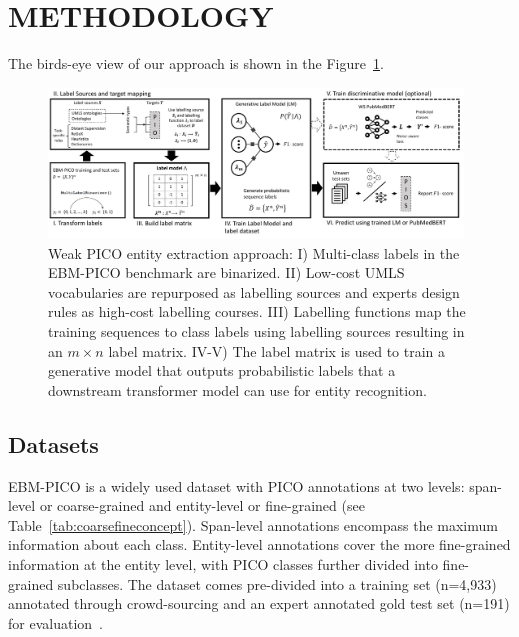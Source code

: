 \documentclass[10.7pt,]{article}
\begin{document}
\section{METHODOLOGY}\label{methods}
%
The birds-eye view of our approach is shown in the Figure~\ref{fig:approach}.
%
\begin{figure}[ht]
\centering
\includegraphics[width=0.98\textwidth]{figures/approach.pdf}
\caption{Weak PICO entity extraction approach: I) Multi-class labels in the EBM-PICO benchmark are binarized. II) Low-cost UMLS vocabularies are repurposed as labelling sources and experts design rules as high-cost labelling courses. III) Labelling functions map the training sequences to class labels using labelling sources resulting in an $m \times n$ label matrix. IV-V) The label matrix is used to train a generative model that outputs probabilistic labels that a downstream transformer model can use for entity recognition.}
\label{fig:approach}
\end{figure}
%
\subsection{Datasets}\label{data}
%
EBM-PICO is a widely used dataset with PICO annotations at two levels: span-level or coarse-grained and entity-level or fine-grained (see Table~\ref{tab:coarsefineconcept}).
Span-level annotations encompass the maximum information about each class.
Entity-level annotations cover the more fine-grained information at the entity level, with PICO classes further divided into fine-grained subclasses.
The dataset comes pre-divided into a training set (n=4,933) annotated through crowd-sourcing and an expert annotated gold test set (n=191) for evaluation~\cite{nye2018corpus}.
\end{document}
